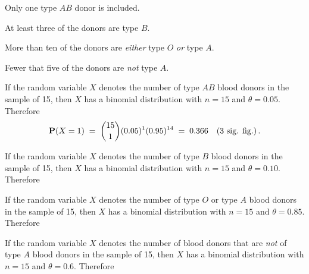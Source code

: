 \begin{ExerciseList}
\be
\item Only one type $AB$ donor is included.
\item At least three of the donors are type $B$.
\item More than ten of the donors are \emph{either} type $O$ \emph{or} type $A$.
\item Fewer that five of the donors are \emph{not} type $A$.
\ee
\Answer
\be
\item  If the random variable $X$ denotes the number of type $AB$ blood donors
  in the sample of 15, then $X$ has a binomial distribution with $n=15$
  and $\theta=0.05$.  Therefore
\[\mathbf{P}(X=1) \;=\;\binom{15}{1} (0.05)^1  (0.95)^{14}\;=\;0.366 \quad (\text{3 sig. fig.}) \,.\]

\medskip
\item  If the random variable $X$ denotes the number of type $B$  blood donors
  in the sample of 15, then $X$ has a binomial distribution with $n=15$
  and $\theta=0.10$.  Therefore

\medskip
\item If the random variable $X$ denotes the number of type  $O$ or type $A$ blood donors
  in the sample of 15, then $X$ has a binomial distribution with $n=15$
  and $\theta=0.85$.  Therefore

\medskip
\item If the random variable $X$ denotes the number of blood donors that
  are \emph{not} of type $A$ blood donors
  in the sample of 15, then $X$ has a binomial distribution with $n=15$
  and $\theta=0.6$.  Therefore
\ee




\end{ExerciseList}
